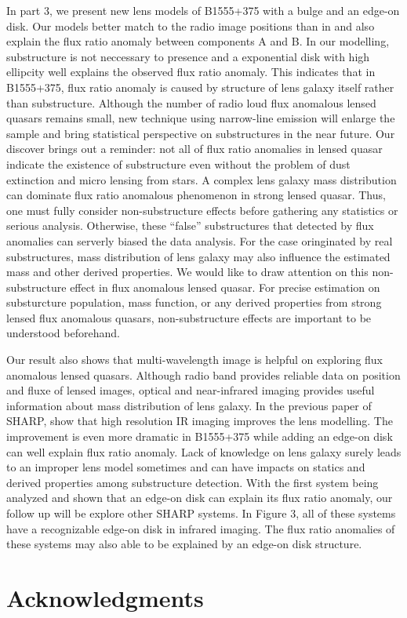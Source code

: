\documentclass[useAMS,usenatbib]{mn2e}
\begin{document}
In part 3, we present new lens models of B1555+375 with a bulge and an edge-on disk. Our models better match to the radio image positions than in \citet{Marlow} and also explain the flux ratio anomaly between components A and B. In our modelling, substructure is not neccessary to presence and a  exponential disk with high ellipcity well explains the observed flux ratio anomaly. This indicates that in B1555+375, flux ratio anomaly is caused by structure of lens galaxy itself rather than substructure. Although the number of radio loud flux anomalous lensed quasars remains small, new technique using narrow-line emission will enlarge the sample and bring statistical perspective on substructures in the near future. Our discover brings out a reminder: not all of flux ratio anomalies in lensed quasar indicate the existence of substructure even without the problem of dust extinction and micro lensing from stars. A complex lens galaxy mass distribution can dominate flux ratio anomalous phenomenon in strong lensed quasar. Thus, one must fully consider non-substructure effects before gathering any statistics or serious analysis. Otherwise, these ``false'' substructures that detected by flux anomalies can serverly biased the data analysis. For the case oringinated by real  substructures, mass distribution of lens galaxy may also influence the estimated mass and other derived properties. We would like to draw attention on this non-substructure effect in flux anomalous lensed quasar. For precise estimation on substurcture population, mass function, or any derived properties from strong lensed flux anomalous quasars, non-substructure effects are important to be understood beforehand.

Our result also shows that multi-wavelength image is helpful on exploring flux anomalous lensed quasars. Although radio band provides reliable data on position and fluxe of lensed images, optical and near-infrared imaging provides useful information about mass distribution of lens galaxy. In the previous paper of SHARP, \citet{SHARP12} show that high resolution IR imaging improves the lens modelling. The improvement is even more dramatic in B1555+375 while adding an edge-on disk can well explain flux ratio anomaly. Lack of knowledge on lens galaxy surely leads to an improper lens model sometimes and can have impacts on statics and derived properties among substructure detection. With the first system being analyzed and shown that an edge-on disk can explain its flux ratio anomaly, our follow up will be explore other SHARP systems. In Figure 3, all of these systems have a recognizable edge-on disk in infrared imaging. The flux ratio anomalies of these systems may also able to be explained by an edge-on disk structure.\\
 

\section*{Acknowledgments}







\label{lastpage}
\end{document}
